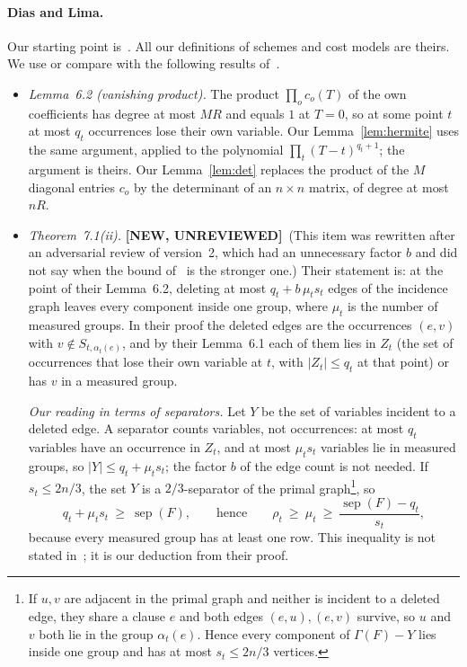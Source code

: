 \documentclass[11pt,a4paper]{article}
\newcommand{\NEWU}{\textbf{[NEW, UNREVIEWED]}}
\theoremstyle{definition}
\theoremstyle{remark}
\newcommand{\sep}{\operatorname{sep}}
\newcommand{\Gr}{\Gamma}
\begin{document}
\paragraph{Dias and Lima.} Our starting point is~\cite{DL}. All our definitions of schemes
and cost models are theirs. We use or compare with the following results of~\cite{DL}.
\begin{itemize}
\item \emph{Lemma~6.2 (vanishing product).} The product $\prod_o c_o(T)$ of the own
 coefficients has degree at most $MR$ and equals $1$ at $T=0$, so at some point $t$ at most
 $q_t$ occurrences lose their own variable. Our Lemma~\ref{lem:hermite} uses the same
 argument, applied to the polynomial $\prod_{t}(T-t)^{q_t+1}$; the argument is theirs. Our
 Lemma~\ref{lem:det} replaces the product of the $M$ diagonal entries $c_o$ by the
 determinant of an $n\times n$ matrix, of degree at most $nR$.
\item \emph{Theorem~7.1(ii).} \NEWU\ (This item was rewritten after an adversarial review
 of version~2, which had an unnecessary factor $b$ and did not say when the bound
 of~\cite{DL} is the stronger one.) Their statement is: at the point of their Lemma~6.2,
 deleting at most $q_t+b\,\mu_ts_t$ edges of the incidence graph leaves every component
 inside one group, where $\mu_t$ is the number of measured groups. In their proof the
 deleted edges are the occurrences $(e,v)$ with $v\notin S_{t,\alpha_t(e)}$, and by their
 Lemma~6.1 each of them lies in $Z_t$ (the set of occurrences that lose their own variable
 at $t$, with $|Z_t|\le q_t$ at that point) or has $v$ in a measured group.

 \emph{Our reading in terms of separators.} Let $Y$ be the set of variables incident to a
 deleted edge. A separator counts variables, not occurrences: at most $q_t$ variables have
 an occurrence in $Z_t$, and at most $\mu_ts_t$ variables lie in measured groups, so
 $|Y|\le q_t+\mu_ts_t$; the factor $b$ of the edge count is not needed. If $s_t\le 2n/3$,
 the set $Y$ is a $2/3$-separator of the primal graph\footnote{If $u,v$ are adjacent
 in the primal graph and neither is incident to a deleted edge, they share a clause $e$ and
 both edges $(e,u),(e,v)$ survive, so $u$ and $v$ both lie in the group $\alpha_t(e)$. Hence
 every component of $\Gr(F)-Y$ lies inside one group and has at most $s_t\le2n/3$
 vertices.}, so
 \[
 q_t+\mu_t s_t\ \ge\ \sep(F),\qquad\text{hence}\qquad
 \rho_t\ \ge\ \mu_t\ \ge\ \frac{\sep(F)-q_t}{s_t},
 \]
 because every measured group has at least one row. This inequality is not stated
 in~\cite{DL}; it is our deduction from their proof.


\end{itemize}
\end{document}
